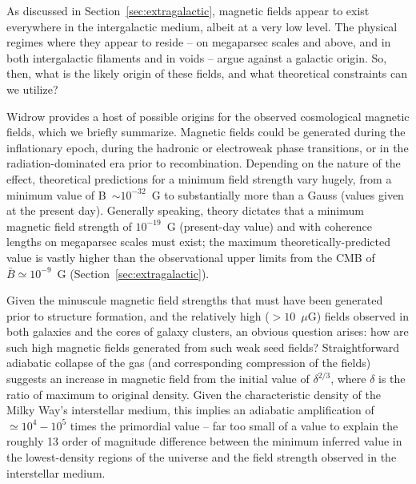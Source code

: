 
As discussed in Section~\ref{sec:extragalactic}, magnetic fields
appear to exist everywhere in the intergalactic medium, albeit at a
very low level.  The physical regimes where they appear to reside --
on megaparsec scales and above, and in both intergalactic filaments
and in voids -- argue against a galactic origin.  So, then, what is
the likely origin of these fields, and what theoretical constraints
can we utilize?

Widrow \cite{2002RvMP...74..775W,2012SSRv..166...37W} provides a host
of possible origins for the observed cosmological magnetic fields,
which we briefly summarize.  Magnetic fields could be generated during
the inflationary epoch, during the hadronic or electroweak phase
transitions, or in the radiation-dominated era prior to recombination.
Depending on the nature of the effect, theoretical predictions for a
minimum field strength vary hugely, from a minimum value of B~$\sim
10^{-32}$~G to substantially more than a Gauss (values given at the
present day).  Generally speaking, theory dictates that a minimum
magnetic field strength of $10^{-19}$~G (present-day value) and with
coherence lengths on megaparsec scales must exist; the maximum
theoretically-predicted value is vastly higher than the observational
upper limits from the CMB of $\bar{B} \simeq 10^{-9}$~G (Section~\ref{sec:extragalactic}).

Given the minuscule magnetic field strengths that must have been
generated prior to structure formation, and the relatively high ($>
10$~$\mu$G) fields observed in both galaxies and the cores of galaxy
clusters, an obvious question arises: how are such high magnetic
fields generated from such weak seed fields?  Straightforward
adiabatic collapse of the gas (and corresponding compression of the
fields) suggests an increase in magnetic field from the initial value
of $\delta^{2/3}$, where $\delta$ is the ratio of maximum to original
density.  Given the characteristic density of the Milky Way's
interstellar medium, this implies an adiabatic amplification of
$\simeq 10^4 - 10^5$ times the primordial value -- far too small of a
value to explain the roughly 13 order of magnitude difference between
the minimum inferred value in the lowest-density regions of the
universe and the field strength observed in the interstellar medium.

